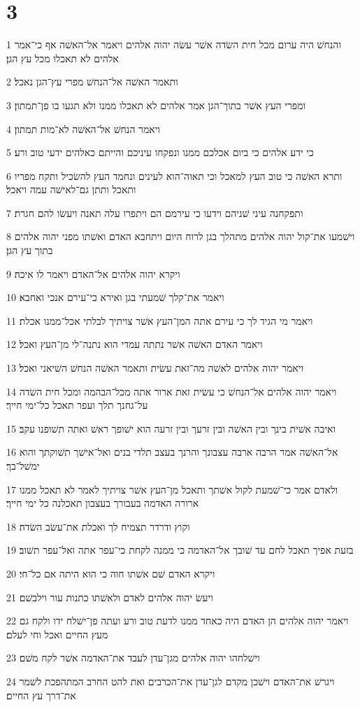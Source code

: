 \chapter{3}

\par 1 והנחשׁ היה ערום מכל חית השׂדה אשׁר עשׂה יהוה אלהים ויאמר אל־האשׁה אף כי־אמר אלהים לא תאכלו מכל עץ הגן׃
\par 2 ותאמר האשׁה אל־הנחשׁ מפרי עץ־הגן נאכל׃
\par 3 ומפרי העץ אשׁר בתוך־הגן אמר אלהים לא תאכלו ממנו ולא תגעו בו פן־תמתון׃
\par 4 ויאמר הנחשׁ אל־האשׁה לא־מות תמתון׃
\par 5 כי ידע אלהים כי ביום אכלכם ממנו ונפקחו עיניכם והייתם כאלהים ידעי טוב ורע׃
\par 6 ותרא האשׁה כי טוב העץ למאכל וכי תאוה־הוא לעינים ונחמד העץ להשׂכיל ותקח מפריו ותאכל ותתן גם־לאישׁה עמה ויאכל׃
\par 7 ותפקחנה עיני שׁניהם וידעו כי עירמם הם ויתפרו עלה תאנה ויעשׂו להם חגרת׃
\par 8 וישׁמעו את־קול יהוה אלהים מתהלך בגן לרוח היום ויתחבא האדם ואשׁתו מפני יהוה אלהים בתוך עץ הגן׃
\par 9 ויקרא יהוה אלהים אל־האדם ויאמר לו איכה׃
\par 10 ויאמר את־קלך שׁמעתי בגן ואירא כי־עירם אנכי ואחבא׃
\par 11 ויאמר מי הגיד לך כי עירם אתה המן־העץ אשׁר צויתיך לבלתי אכל־ממנו אכלת׃
\par 12 ויאמר האדם האשׁה אשׁר נתתה עמדי הוא נתנה־לי מן־העץ ואכל׃
\par 13 ויאמר יהוה אלהים לאשׁה מה־זאת עשׂית ותאמר האשׁה הנחשׁ השׁיאני ואכל׃
\par 14 ויאמר יהוה אלהים אל־הנחשׁ כי עשׂית זאת ארור אתה מכל־הבהמה ומכל חית השׂדה על־גחנך תלך ועפר תאכל כל־ימי חייך׃
\par 15 ואיבה אשׁית בינך ובין האשׁה ובין זרעך ובין זרעה הוא ישׁופך ראשׁ ואתה תשׁופנו עקב׃
\par 16 אל־האשׁה אמר הרבה ארבה עצבונך והרנך בעצב תלדי בנים ואל־אישׁך תשׁוקתך והוא ימשׁל־בך׃
\par 17 ולאדם אמר כי־שׁמעת לקול אשׁתך ותאכל מן־העץ אשׁר צויתיך לאמר לא תאכל ממנו ארורה האדמה בעבורך בעצבון תאכלנה כל ימי חייך׃
\par 18 וקוץ ודרדר תצמיח לך ואכלת את־עשׂב השׂדה׃
\par 19 בזעת אפיך תאכל לחם עד שׁובך אל־האדמה כי ממנה לקחת כי־עפר אתה ואל־עפר תשׁוב׃
\par 20 ויקרא האדם שׁם אשׁתו חוה כי הוא היתה אם כל־חי׃
\par 21 ויעשׂ יהוה אלהים לאדם ולאשׁתו כתנות עור וילבשׁם׃
\par 22 ויאמר יהוה אלהים הן האדם היה כאחד ממנו לדעת טוב ורע ועתה פן־ישׁלח ידו ולקח גם מעץ החיים ואכל וחי לעלם׃
\par 23 וישׁלחהו יהוה אלהים מגן־עדן לעבד את־האדמה אשׁר לקח משׁם׃
\par 24 ויגרשׁ את־האדם וישׁכן מקדם לגן־עדן את־הכרבים ואת להט החרב המתהפכת לשׁמר את־דרך עץ החיים׃

